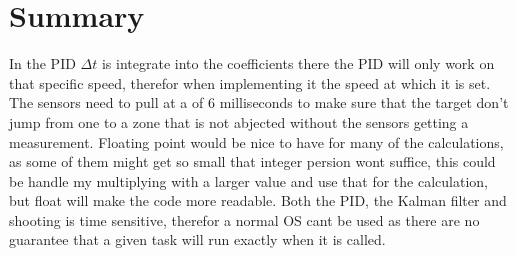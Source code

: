 \section{Summary}
In the PID $\Delta t$ is integrate into the coefficients there the PID will only work on that specific speed, therefor when implementing it the speed at which it is set. The sensors need to pull at a of 6 milliseconds to make sure that the target don't jump from one to a zone that is not abjected without the sensors getting a measurement. Floating point would be nice to have for many of the calculations, as some of them might get so small that integer persion wont suffice, this could be handle my multiplying with a larger value and use that for the calculation, but float will make the code more readable. Both the PID, the Kalman filter and shooting is time sensitive, therefor a normal OS cant be used as there are no guarantee that a given task will run exactly when it is called.

